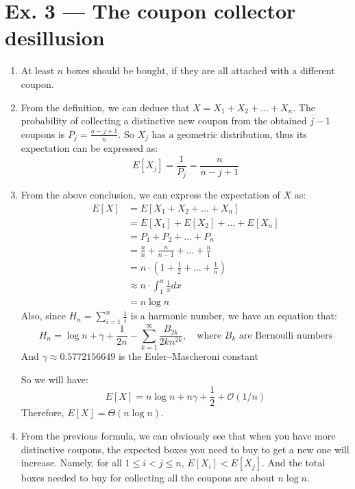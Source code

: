 \documentclass[12pt, a4paper]{article}
\begin{document}
\section*{Ex. 3 --- The coupon collector desillusion}
\begin{enumerate}
    \item At least $n$ boxes should be bought, if they are all attached with a different coupon.
    \item From the definition, we can deduce that $X = X_1 + X_2 + \dots + X_n$. 
          The probability of collecting a distinctive new coupon from the obtained $j - 1$ coupons is $P_j = \frac{n-j+1}{n}$. 
          So $X_j$ has a geometric distribution, thus its expectation can be expressed as:
          \[E[X_j] = \frac{1}{P_j} = \frac{n}{n - j + 1}\]
    \item From the above conclusion, we can express the expectation of $X$ as:
          \begin{align*}
              E[X] &= E[X_1 + X_2 + \dots + X_n]\\
                   &= E[X_1] + E[X_2] + \dots + E[X_n]\\
                   &= P_1 + P_2 + \dots + P_n\\
                   &= \frac{n}{n} + \frac{n}{n-1} + \dots + \frac{n}{1}\\
                   &= n\cdot (1 + \frac{1}{2} + \dots + \frac{1}{n})\\
                   &\approx n\cdot \int_1^n \frac{1}{x} dx\\
                   &= n\log n
          \end{align*}
          Also, since $H_n = \sum_{i=1}^n \frac{1}{i}$ is a harmonic number, we have an equation that:
          \[H_n = \log n + \gamma + \frac{1}{2n} - \sum_{k=1}^\infty \frac{B_{2k}}{2kn^{2k}}, \quad \text{where } B_k \text{ are Bernoulli numbers}\]
          And $\gamma \approx 0.5772156649$ is the Euler–Mascheroni constant

          So we will have:
          \[E[X] = n\log n + n\gamma + \frac{1}{2} + \mathcal{O}(1/n)\]
          Therefore, $E[X] = \Theta(n\log n)$.
    \item From the previous formula, we can obviously see that when you have more distinctive coupons, 
          the expected boxes you need to buy to get a new one will increase. Namely, for all $1 \leq i < j \leq n$, 
          $E[X_i] < E[X_j]$. And the total boxes needed to buy for collecting all the coupons are about $n\log n$.
\end{enumerate}
\end{document}
